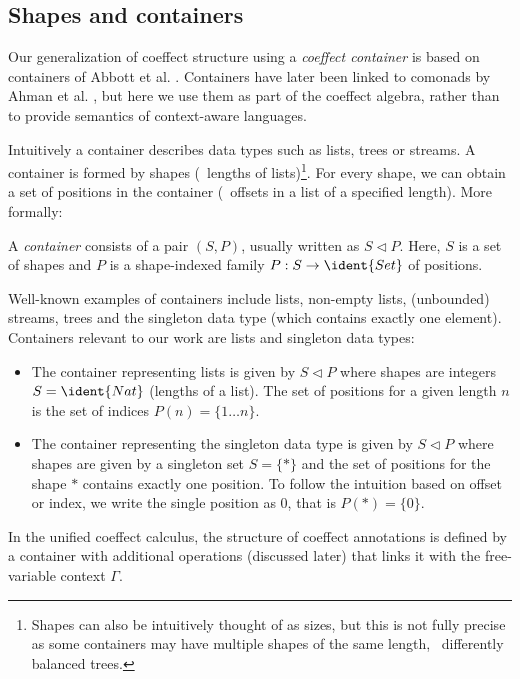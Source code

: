 \subsection{Shapes and containers}
Our generalization of coeffect structure using a \emph{coeffect container} is based on containers of
Abbott et al. \cite{types-containers}. Containers have later been linked to comonads by Ahman et al.
\cite{comonads-containers}, but here we use them as part of the coeffect algebra, rather than to
provide semantics of context-aware languages.

Intuitively a container describes data
types such as lists, trees or streams. A container is formed by shapes (\eg~lengths of
lists)\footnote{Shapes can also be intuitively thought of as sizes, but this is not fully precise
as some containers may have multiple shapes of the same length, \eg~differently balanced trees.}.
For every shape, we can obtain a set of positions in the container (\eg~offsets in a list of a
specified length). More formally:

\begin{definition}
A \emph{container} consists of a pair $(S,P)$, usually written as $S \triangleleft P$.
Here, $S$ is a set of shapes and $P$ is a shape-indexed family $P : S \rightarrow \ident{Set}$
of positions.
\end{definition}

\noindent
Well-known examples of containers include lists, non-empty lists, (un\-boun\-ded) streams,
trees and the singleton data type (which contains exactly one element). Containers relevant
to our work are lists and singleton data types:

\begin{itemize}
\item The container representing lists is given by $S \triangleleft P$ where
  shapes are integers $S = \ident{Nat}$ (lengths of a list). The set of positions for a
  given length $n$ is the set of indices $P(n)= \{ 1 \ldots n \}$.

\item The container representing the singleton data type is given by $S \triangleleft P$ where
  shapes are given by a singleton set $S = \{ \ast \}$ and the set of positions for the
  shape $\ast$ contains exactly one position. To follow the intuition based on offset or
  index, we write the single position as $0$, that is $P(\ast) = \{ 0 \}$.
\end{itemize}

\noindent
In the unified coeffect calculus, the structure of coeffect annotations is defined by a
container with additional operations (discussed later) that links it with the free-variable
context $\Gamma$.

